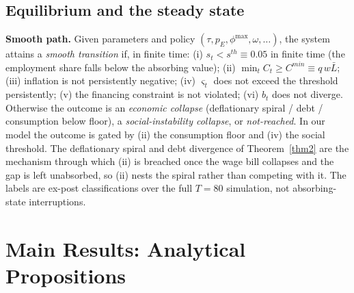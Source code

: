 \documentclass[review,12pt]{elsarticle}
\theoremstyle{plain}
\theoremstyle{definition}
\theoremstyle{remark}
\newcommand{\barL}{\bar{L}}
\begin{document}
\subsection{Equilibrium and the steady state}
\textbf{Smooth path.} Given parameters and policy $(\tau,p_E,\phi^{\max},\omega,\dots)$, the system attains a \emph{smooth transition} if, in finite time: (i) $s_t<s^{th}\equiv0.05$ in finite time (the employment share falls below the absorbing value); (ii) $\min_t C_t\ge C^{min}\equiv q\,w\barL$; (iii) inflation is not persistently negative; (iv) $\varsigma_t$ does not exceed the threshold persistently; (v) the financing constraint is not violated; (vi) $b_t$ does not diverge. Otherwise the outcome is an \emph{economic collapse} (deflationary spiral / debt / consumption below floor), a \emph{social-instability collapse}, or \emph{not-reached}. In our model the outcome is gated by (ii) the consumption floor and (iv) the social threshold. The deflationary spiral and debt divergence of Theorem~\ref{thm2} are the mechanism through which (ii) is breached once the wage bill collapses and the gap is left unabsorbed, so (ii) nests the spiral rather than competing with it. The labels are ex-post classifications over the full $T=80$ simulation, not absorbing-state interruptions.

\section{Main Results: Analytical Propositions}
\label{sec:main-results}
\end{document}
